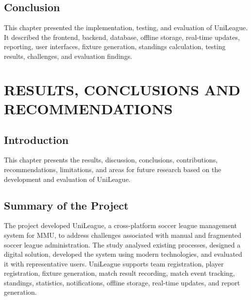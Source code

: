 \documentclass[12pt,a4paper]{report}
\begin{document}
\section{Conclusion}
This chapter presented the implementation, testing, and evaluation of UniLeague. It described
the frontend, backend, database, offline storage, real-time updates, reporting, user interfaces,
fixture generation, standings calculation, testing results, challenges, and evaluation findings.

\chapter{RESULTS, CONCLUSIONS AND RECOMMENDATIONS}
\section{Introduction}
This chapter presents the results, discussion, conclusions, contributions, recommendations,
limitations, and areas for future research based on the development and evaluation of UniLeague.

\section{Summary of the Project}
The project developed UniLeague, a cross-platform soccer league management system for MMU,
to address challenges associated with manual and fragmented soccer league administration.
The study analysed existing processes, designed a digital solution, developed the system
using modern technologies, and evaluated it with representative users. UniLeague supports
team registration, player registration, fixture generation, match result recording, match
event tracking, standings, statistics, notifications, offline storage, real-time updates,
and report generation.
\end{document}
